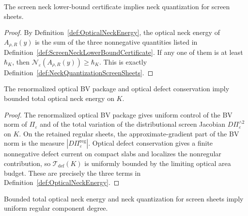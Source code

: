 \begin{proposition}\label{prop:NeckLowerBoundCertificateGate}
The screen neck lower-bound certificate implies neck quantization for screen sheets.
\end{proposition}

\begin{proof}
By Definition~\ref{def:OpticalNeckEnergy}, the optical neck energy of $A_{\rho,R}(y)$ is the sum of the three nonnegative quantities listed in Definition~\ref{def:ScreenNeckLowerBoundCertificate}. If any one of them is at least $\hbar_K$, then $\mathcal N_\varepsilon(A_{\rho,R}(y))\ge\hbar_K$. This is exactly Definition~\ref{def:NeckQuantizationScreenSheets}.
\end{proof}

\begin{lemma}\label{lem:BVBoundedNeckEnergy}
The renormalized optical BV package and optical defect conservation imply bounded total optical neck energy on $K$.
\end{lemma}

\begin{proof}
The renormalized optical BV package gives uniform control of the BV norm of $\Pi_\varepsilon$ and of the total variation of the distributional screen Jacobian $D\Pi_\varepsilon^{\wedge2}$ on $K$. On the retained regular sheets, the approximate-gradient part of the BV norm is the measure $|D\Pi_\varepsilon^{\mathrm{reg}}|$. Optical defect conservation gives a finite nonnegative defect current on compact slabs and localizes the nonregular contribution, so $\mathcal T_{\mathrm{def}}(K)$ is uniformly bounded by the limiting optical area budget. These are precisely the three terms in Definition~\ref{def:OpticalNeckEnergy}.
\end{proof}

\begin{lemma}\label{lem:QuantizedNecksBoundDegree}
Bounded total optical neck energy and neck quantization for screen sheets imply uniform regular component degree.
\end{lemma}

